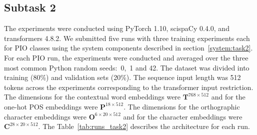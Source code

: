 \documentclass[11pt]{article}
\begin{document}
\subsection{Subtask 2}
\label{sec:setup_t2}
%
The experiments were conducted using PyTorch 1.10, scispaCy 0.4.0, and transformers 4.8.2.
We submitted five runs with three training experiments each for PIO classes using the system components described in section~\ref{system:task2}.
For each PIO run, the experiments were conducted and averaged over the three most common Python random seeds:~0,~1 and 42.
The dataset was divided into training (80\%) and validation sets (20\%).
The sequence input length was 512 tokens across the experiments corresponding to the transformer input restriction.
The dimensions for the contextual word embeddings were $\mathbf{T}^{768 \times 512}$ and for the one-hot POS embeddings were $\mathbf{P}^{18 \times 512}$.
The dimensions for the orthographic character embeddings were $\mathbf{O}^{6 \times 20 \times 512}$ and for the character embeddings were $\mathbf{C}^{28 \times 20 \times 512}$.
The Table~\ref{tab:runs_task2} describes the architecture for each run.
%
\end{document}
